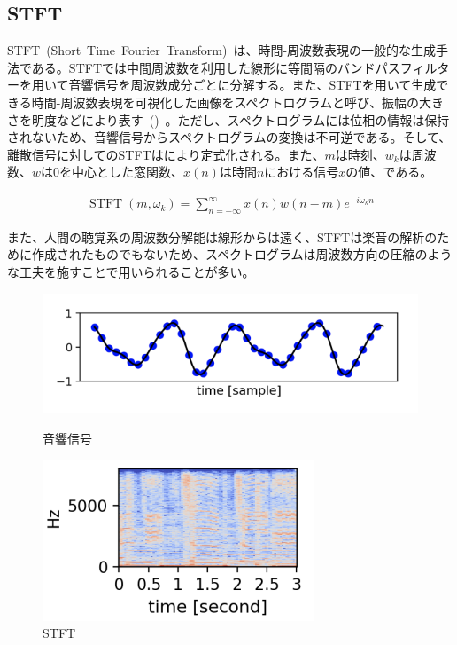 \subsection{STFT}

STFT~(Short~Time~Fourier~Transform)~は、時間-周波数表現の一般的な生成手法である。STFTでは中間周波数を利用した線形に等間隔のバンドパスフィルターを用いて音響信号を周波数成分ごとに分解する。また、STFTを用いて生成できる時間-周波数表現を可視化した画像をスペクトログラムと呼び、振幅の大きさを明度などにより表す~()~。ただし、スペクトログラムには位相の情報は保持されないため、音響信号からスペクトログラムの変換は不可逆である。そして、離散信号に対してのSTFTはにより定式化される。また、$m$は時刻、$w_k$は周波数、$w$は0を中心とした窓関数、$x(n)$は時間$n$における信号$x$の値、である。

\begin{align}
    \label{eq:STFT}
    \operatorname{STFT}\left(m, \omega_k\right)=\sum_{n=-\infty}^{\infty} x(n) w(n-m) e^{-i \omega_k n}
\end{align}

また、人間の聴覚系の周波数分解能は線形からは遠く、STFTは楽音の解析のために作成されたものでもないため、スペクトログラムは周波数方向の圧縮のような工夫を施すことで用いられることが多い。

\begin{figure}[b]
\centering
\begin{minipage}[b]{0.48\columnwidth}
\centering
\includegraphics[width=\columnwidth]{figure/audio_signal.png}
\caption{音響信号}
\label{fig:audio_signal}
\end{minipage}
\begin{minipage}[b]{0.48\columnwidth}
\centering
\includegraphics[width=\columnwidth]{figure/stft.png}
\caption{STFT}
\label{fig:STFT}
\end{minipage}
\end{figure}


